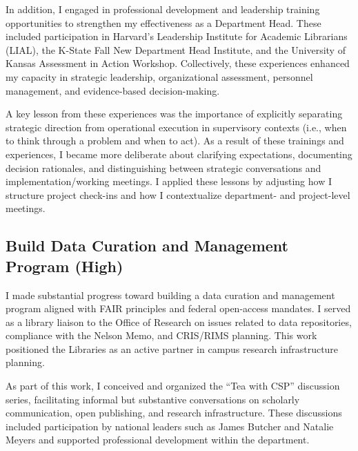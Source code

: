 \vspace{\baselineskip}

In addition, I engaged in professional development and leadership training opportunities to strengthen my effectiveness as a Department Head. These included participation in Harvard’s Leadership Institute for Academic Librarians (LIAL),  the K-State Fall New Department Head Institute, and the University of Kansas Assessment in Action Workshop. Collectively, these experiences enhanced my capacity in strategic leadership, organizational assessment, personnel management, and evidence-based decision-making.

\vspace{\baselineskip}

A key lesson from these experiences was the importance of explicitly separating strategic direction from operational execution in supervisory contexts (i.e., when to think through a problem and when to act). As a result of these trainings and experiences, I became more deliberate about clarifying expectations, documenting decision rationales, and distinguishing between strategic conversations and implementation/working meetings. I applied these lessons by adjusting how I structure project check-ins and how I contextualize department- and project-level meetings.

\vspace{\baselineskip}


\subsection*{Build Data Curation and Management Program (High)}

I made substantial progress toward building a data curation and management program aligned with FAIR principles and federal open-access mandates. I served as a library liaison to the Office of Research on issues related to data repositories, compliance with the Nelson Memo, and CRIS/RIMS planning. This work positioned the Libraries as an active partner in campus research infrastructure planning.

\vspace{\baselineskip}

As part of this work, I conceived and organized the ``Tea with CSP'' discussion series, facilitating informal but substantive conversations on scholarly communication, open publishing, and research infrastructure. These discussions included participation by national leaders such as James Butcher and Natalie Meyers and supported professional development within the department.

